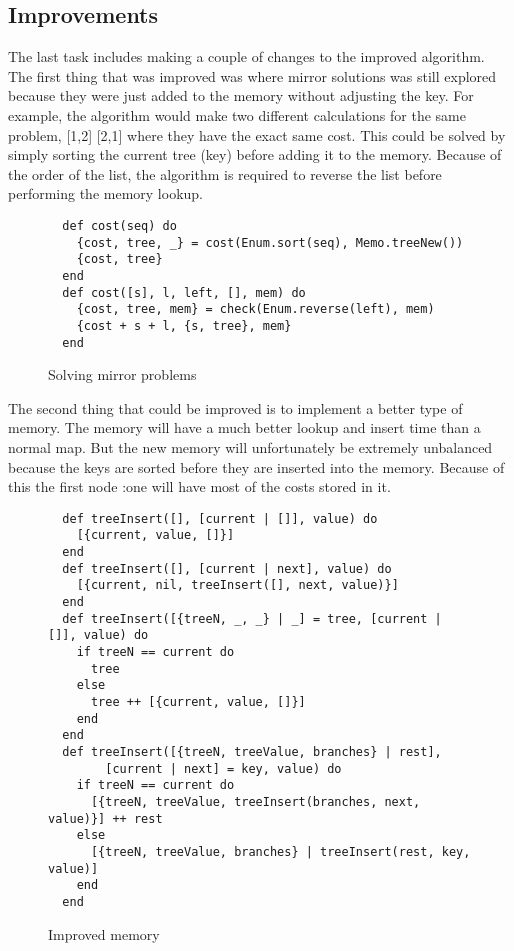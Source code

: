 \documentclass[a4paper,11pt]{article}
\begin{document}
\subsection*{Improvements}
The last task includes making a couple of changes to the improved algorithm. The first thing that was improved was where mirror solutions was still explored because they were just added to the memory without adjusting the key. For example, the algorithm would make two different calculations for the same problem, [1,2] [2,1] where they have the exact same cost. This could be solved by simply sorting the current tree (key) before adding it to the memory. Because of the order of the list, the algorithm is required to reverse the list before performing the memory lookup.

\begin{figure}[H]
\begin{verbatim}
  def cost(seq) do
    {cost, tree, _} = cost(Enum.sort(seq), Memo.treeNew())
    {cost, tree}
  end
  def cost([s], l, left, [], mem) do
    {cost, tree, mem} = check(Enum.reverse(left), mem)
    {cost + s + l, {s, tree}, mem}
  end
\end{verbatim}
\caption{Solving mirror problems}
\label{Figure:4}
\end{figure}

The second thing that could be improved is to implement a better type of memory. The memory will have a much better lookup and insert time than a normal map. But the new memory will unfortunately be extremely unbalanced because the keys are sorted before they are inserted into the memory. Because of this the first node :one will have most of the costs stored in it. 

\begin{figure}[H]
\begin{verbatim}
  def treeInsert([], [current | []], value) do
    [{current, value, []}]
  end
  def treeInsert([], [current | next], value) do
    [{current, nil, treeInsert([], next, value)}]
  end
  def treeInsert([{treeN, _, _} | _] = tree, [current | []], value) do
    if treeN == current do
      tree
    else
      tree ++ [{current, value, []}]
    end
  end
  def treeInsert([{treeN, treeValue, branches} | rest],
        [current | next] = key, value) do
    if treeN == current do
      [{treeN, treeValue, treeInsert(branches, next, value)}] ++ rest
    else
      [{treeN, treeValue, branches} | treeInsert(rest, key, value)]
    end
  end
\end{verbatim}
\caption{Improved memory}
\label{Figure:5}
\end{figure}
\end{document}
